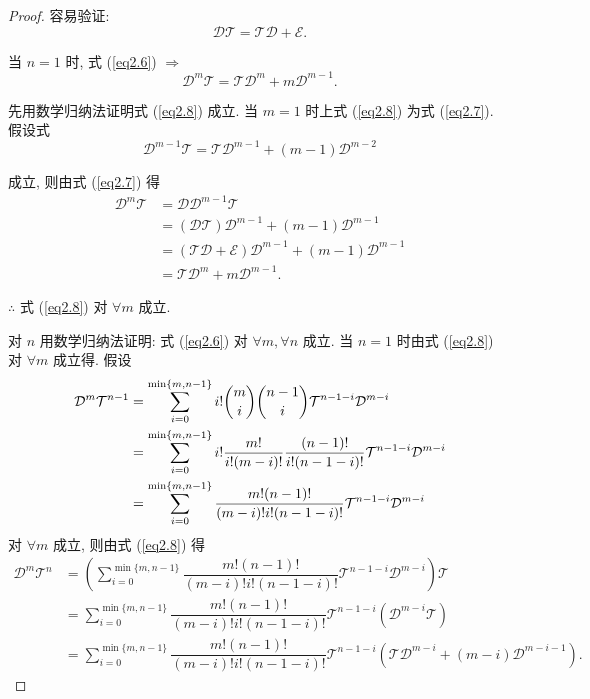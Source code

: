 \documentclass{ctexart}
\begin{document}
\begin{proof}
    容易验证:
    \begin{equation}\label{eq2.7}
        \mathcal{DT}=\mathcal{TD}+\mathcal{E}.
    \end{equation}

    当 $n=1$ 时, 式 (\ref{eq2.6}) $\Rightarrow$
    \begin{equation}\label{eq2.8}
        \mathcal{D}^m\mathcal{T}=\mathcal{T}\mathcal{D}^m+m\mathcal{D}^{m-1}.
    \end{equation}

    先用数学归纳法证明式 (\ref{eq2.8}) 成立. 当 $m=1$ 时上式 (\ref{eq2.8}) 为式 (\ref{eq2.7}). 假设式
    \[\mathcal{D}^{m-1}\mathcal{T}=\mathcal{T}\mathcal{D}^{m-1}+(m-1)\mathcal{D}^{m-2}\]

    成立, 则由式 (\ref{eq2.7}) 得
    \begin{align*}
        \mathcal{D}^m\mathcal{T} & =\mathcal{D}\mathcal{D}^{m-1}\mathcal{T} \\
        & =(\mathcal{DT})\mathcal{D}^{m-1}+(m-1)\mathcal{D}^{m-1} \\
        & =(\mathcal{TD}+\mathcal{E})\mathcal{D}^{m-1}+(m-1)\mathcal{D}^{m-1} \\
        & =\mathcal{T}\mathcal{D}^m+m\mathcal{D}^{m-1}.
    \end{align*}

    $\therefore$ 式 (\ref{eq2.8}) 对 $\forall m$ 成立.

    对 $n$ 用数学归纳法证明: 式 (\ref{eq2.6}) 对 $\forall m,\forall n$ 成立. 当 $n=1$ 时由式 (\ref{eq2.8}) 对 $\forall m$ 成立得. 假设
    \begin{align*}
        \mathcal{D}^m\mathcal{T}^{n-1} & =\sum\limits_{i=0}^{\min\{m,n-1\}}i!\dbinom{m}{i}\dbinom{n-1}{i}\mathcal{T}^{n-1-i}\mathcal{D}^{m-i} \\
        & =\sum\limits_{i=0}^{\min\{m,n-1\}}i!\dfrac{m!}{i!(m-i)!}\dfrac{(n-1)!}{i!(n-1-i)!}\mathcal{T}^{n-1-i}\mathcal{D}^{m-i} \\
        & =\sum\limits_{i=0}^{\min\{m,n-1\}}\dfrac{m!(n-1)!}{(m-i)!i!(n-1-i)!}\mathcal{T}^{n-1-i}\mathcal{D}^{m-i}
    \end{align*}
    对 $\forall m$ 成立, 则由式 (\ref{eq2.8}) 得
    \begin{align*}
        \mathcal{D}^m\mathcal{T}^n & =\left(\sum\limits_{i=0}^{\min\{m,n-1\}}\dfrac{m!(n-1)!}{(m-i)!i!(n-1-i)!}\mathcal{T}^{n-1-i}\mathcal{D}^{m-i}\right)\mathcal{T} \\
        & =\sum\limits_{i=0}^{\min\{m,n-1\}}\dfrac{m!(n-1)!}{(m-i)!i!(n-1-i)!}\mathcal{T}^{n-1-i}(\mathcal{D}^{m-i}\mathcal{T}) \\
        & =\sum\limits_{i=0}^{\min\{m,n-1\}}\dfrac{m!(n-1)!}{(m-i)!i!(n-1-i)!}\mathcal{T}^{n-1-i}(\mathcal{T}\mathcal{D}^{m-i}+(m-i)\mathcal{D}^{m-i-1}).
    \end{align*}
    

\end{proof}
\end{document}
